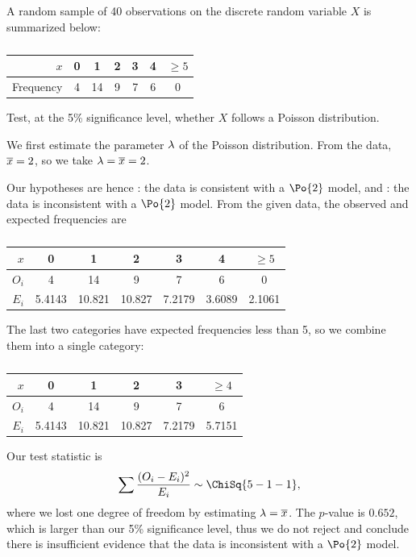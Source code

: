 \begin{sample}
    A random sample of 40 observations on the discrete random variable $X$ is summarized below:

    \begin{table}[H]
        \centering
        \begin{tabular}{|r|c|c|c|c|c|c|}
        \hline
        $x$ & 0 & 1 & 2 & 3 & 4 & $\geq 5$ \\ \hline
        Frequency & 4 & 14 & 9 & 7 & 6 & 0 \\ \hline
        \end{tabular}
        \caption{}
    \end{table}

    Test, at the 5\% significance level, whether $X$ follows a Poisson distribution.
\end{sample}
\begin{sampans}
    We first estimate the parameter $\lambda$ of the Poisson distribution. From the data, $\overline{x} = 2$, so we take $\lambda = \overline{x} = 2$.

    Our hypotheses are hence \nullhyp: the data is consistent with a $\Po{2}$ model, and \althyp: the data is inconsistent with a $\Po{2}$ model. From the given data, the observed and expected frequencies are

    \begin{table}[H]
        \centering
        \begin{tabular}{|r|c|c|c|c|c|c|}
        \hline
        $x$ & 0 & 1 & 2 & 3 & 4 & $\geq 5$ \\ \hline
        $O_i$ & 4 & 14 & 9 & 7 & 6 & 0 \\ \hline
        $E_i$ & 5.4143 & 10.821 & 10.827 & 7.2179 & 3.6089 & 2.1061 \\ \hline
        \end{tabular}
        \caption{}
    \end{table}
    The last two categories have expected frequencies less than 5, so we combine them into a single category:
    \begin{table}[H]
        \centering
        \begin{tabular}{|r|c|c|c|c|c|}
        \hline
        $x$ & 0 & 1 & 2 & 3 & $\geq 4$ \\ \hline
        $O_i$ & 4 & 14 & 9 & 7 & 6 \\ \hline
        $E_i$ & 5.4143 & 10.821 & 10.827 & 7.2179 & 5.7151 \\ \hline
        \end{tabular}
        \caption{}
    \end{table}
    Our test statistic is \[\sum \frac{(O_i - E_i)^2}{E_i} \sim \ChiSq{5-1-1},\] where we lost one degree of freedom by estimating $\lambda = \overline{x}$. The $p$-value is $0.652$, which is larger than our 5\% significance level, thus we do not reject \nullhyp{} and conclude there is insufficient evidence that the data is inconsistent with a $\Po{2}$ model.
\end{sampans}

